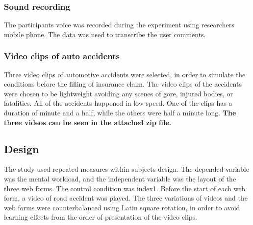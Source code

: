 \documentclass[../main/Feedback.tex]{subfiles}
\begin{document}
\subsubsection{Sound recording}
The participants voice was recorded during the experiment using researchers mobile phone. The data was used to transcribe the user comments.
\subsubsection{Video clips of auto accidents}
Three video clips of automotive accidents were selected, in order to simulate the conditions before the filling of insurance claim. The video clips of the accidents were chosen to be lightweight avoiding any scenes of gore, injured bodies, or fatalities. All of the accidents happened in low speed. One of the clips has a duration of minute and a half, while the others were half a minute long. \textbf{The three videos can be seen in the attached zip file.}
\subsection{Design}
The study used repeated measures within subjects design. The depended variable was the mental workload, and the independent variable was the layout of the three web forms. The control condition was index1. Before the start of each web form, a video of road accident was played. The three variations of videos and the web forms were counterbalanced using Latin square rotation, in order to avoid learning effects from the order of presentation of the video clips.
\end{document}
